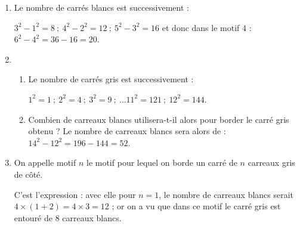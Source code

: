 
\medskip

%
%

\begin{enumerate}
\item %
Le nombre de carrés blancs est successivement :

$3^2 - 1^2 = 8~;~4^2 - 2^2 = 12~;~5^2 - 3^2 = 16$ et donc dans le motif 4 : $6^2 - 4^2 = 36 - 16 = 20$.
\item  
	\begin{enumerate}
		\item %
Le nombre de carrés gris est successivement :
		
$1^2 = 1~;~2^2 = 4~;~3^2 = 9~;~\ldots 11^2 = 121~;~12^2 = 144$.
		\item Combien de carreaux blancs utilisera-t-il alors pour border le carré gris obtenu ?
		Le nombre de carreaux blancs sera alors de : $14^2 - 12^2 = 196 - 144 = 52$.
	\end{enumerate}
\item  On appelle \og  motif $n$ \fg{} le motif pour lequel on borde un carré de $n$ carreaux gris de
côté.
	
%
C'est l'expression  : avec elle pour $n = 1$, le nombre de carreaux blancs serait $4\times (1 + 2) = 4 \times 3 = 12$ ; or on a vu que dans ce motif le carré gris est entouré de 8 carreaux blancs.
\end{enumerate}

\vspace{0,5cm}

